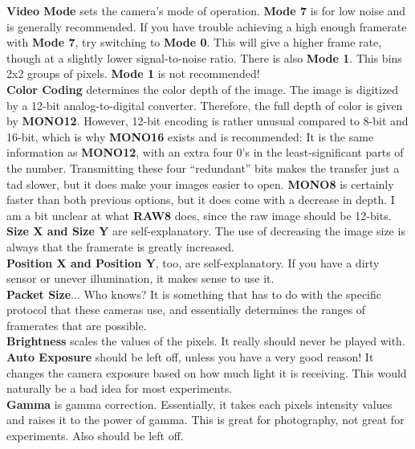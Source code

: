 \documentclass{article}
\begin{document}
\textbf{Video Mode} sets the camera's mode of operation. \textbf{Mode 7} is for low noise and is generally recommended. If you have trouble achieving a high enough framerate with \textbf{Mode 7}, try switching to \textbf{Mode 0}. This will give a higher frame rate, though at a slightly lower signal-to-noise ratio. There is also \textbf{Mode 1}. This bins 2x2 groups of pixels. \textbf{Mode 1} is not recommended!\\

\textbf{Color Coding} determines the color depth of the image. The image is digitized by a 12-bit analog-to-digital converter. Therefore, the full depth of color is given by \textbf{MONO12}. However, 12-bit encoding is rather unusual compared to 8-bit and 16-bit, which is why \textbf{MONO16} exists and is recommended: It is the same information as \textbf{MONO12}, with an extra four $0$'s in the least-significant parts of the number. Transmitting these four ``redundant'' bits makes the transfer just a tad slower, but it does make your images easier to open. \textbf{MONO8} is certainly faster than both previous options, but it does come with a decrease in depth. I am a bit unclear at what \textbf{RAW8} does, since the raw image should be 12-bits.\\

\textbf{Size X and Size Y} are self-explanatory. The use of decreasing the image size is always that the framerate is greatly increased.\\

\textbf{Position X and Position Y}, too, are self-explanatory. If you have a dirty sensor or unever illumination, it makes sense to use it.\\

\textbf{Packet Size}... Who knows? It is something that has to do with the specific protocol that these cameras use, and essentially determines the ranges of framerates that are possible.\\

\textbf{Brightness} scales the values of the pixels. It really should never be played with.\\

\textbf{Auto Exposure} should be left off, unless you have a very good reason! It changes the camera exposure based on how much light it is receiving. This would naturally be a bad idea for most experiments.\\

\textbf{Gamma} is gamma correction. Essentially, it takes each pixels intensity values and raises it to the power of gamma. This is great for photography, not great for experiments. Also should be left off. \\
\end{document}
